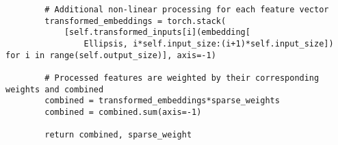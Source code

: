 \documentclass{article}
\begin{document}
\begin{lstlisting}
        # Additional non-linear processing for each feature vector
        transformed_embeddings = torch.stack(
            [self.transformed_inputs[i](embedding[
                Ellipsis, i*self.input_size:(i+1)*self.input_size]) for i in range(self.output_size)], axis=-1)

        # Processed features are weighted by their corresponding weights and combined
        combined = transformed_embeddings*sparse_weights
        combined = combined.sum(axis=-1)

        return combined, sparse_weight





\end{lstlisting}




\clearpage
\end{document}
